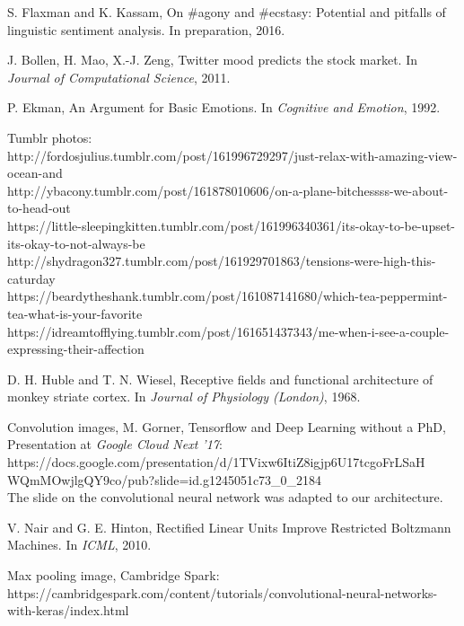 \begin{thebibliography}{999}

S. Flaxman and K. Kassam, On \#agony and \#ecstasy: Potential and pitfalls of linguistic sentiment analysis. In preparation, 2016.

J. Bollen, H. Mao, X.-J. Zeng, Twitter mood predicts the stock market. In \textit{Journal of Computational Science}, 2011.

P. Ekman, An Argument for Basic Emotions. In \textit{Cognitive and Emotion}, 1992.

Tumblr photos:\\
http://fordosjulius.tumblr.com/post/161996729297/just-relax-with-amazing-view-ocean-and\\
http://ybacony.tumblr.com/post/161878010606/on-a-plane-bitchessss-we-about-to-head-out\\
https://little-sleepingkitten.tumblr.com/post/161996340361/its-okay-to-be-upset-its-okay-to-not-always-be\\
http://shydragon327.tumblr.com/post/161929701863/tensions-were-high-this-caturday\\
https://beardytheshank.tumblr.com/post/161087141680/which-tea-peppermint-tea-what-is-your-favorite\\
https://idreamtofflying.tumblr.com/post/161651437343/me-when-i-see-a-couple-expressing-their-affection

D. H. Huble and T. N. Wiesel, Receptive fields and functional architecture of monkey striate cortex. In \textit{Journal of Physiology (London)}, 1968.

Convolution images, M. Gorner, Tensorflow and Deep Learning without a PhD, Presentation at \textit{Google Cloud Next '17}:\\ 
https://docs.google.com/presentation/d/1TVixw6ItiZ8igjp6U17tcgoFrLSaH\\WQmMOwjlgQY9co/pub?slide=id.g1245051c73\_0\_2184\\
The slide on the convolutional neural network was adapted to our architecture.

V. Nair and G. E. Hinton, Rectified Linear Units Improve Restricted Boltzmann Machines. In \textit{ICML}, 2010.

Max pooling image, Cambridge Spark:\\
https://cambridgespark.com/content/tutorials/convolutional-neural-networks-with-keras/index.html


\end{thebibliography}
